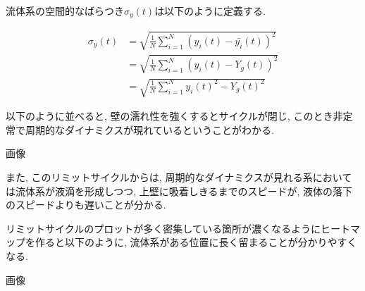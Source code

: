 流体系の空間的なばらつき$\sigma_{y} (t)$は以下のように定義する.

\begin{align}
  \sigma_{y} (t)
  &= \sqrt{\frac{1}{N} \sum_{i=1}^{N} (y_i (t) - \bar{y_i}(t) )^2} \\
  &= \sqrt{\frac{1}{N} \sum_{i=1}^{N} (y_i (t) - Y_g (t) )^2} \\
  &= \sqrt{\frac{1}{N} \sum_{i=1}^{N} {{y_i} (t)}^2 - {{Y_g} (t)}^2}
\end{align}

以下のように並べると, 壁の濡れ性を強くするとサイクルが閉じ, このとき非定常で周期的なダイナミクスが現れているということがわかる.

画像

また, このリミットサイクルからは, 周期的なダイナミクスが見れる系においては流体系が液滴を形成しつつ, 上壁に吸着しきるまでのスピードが, 液体の落下のスピードよりも遅いことが分かる.


% 


% 



リミットサイクルのプロットが多く密集している箇所が濃くなるようにヒートマップを作ると以下のように, 流体系がある位置に長く留まることが分かりやすくなる.

画像

% 



